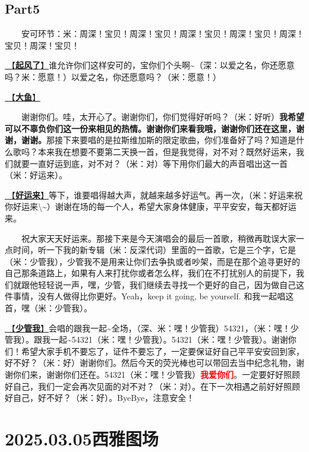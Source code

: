 \documentclass[]{ctexbook}
\begin{document}
\section{Part5}\label{LasVegas-20250301-part5}

  安可环节：米：周深！宝贝！周深！宝贝！周深！宝贝！周深！宝贝！周深！宝贝！周深！宝贝！

\hyperref[the-wind-rises]{🎵【\textbf{起风了}】}谁允许你们这样安可的，宝你们个头啊\textasciitilde（深：以爱之名，你还愿意吗？米：愿意！）以爱之名，你还愿意吗？（米：愿意！）

\hyperref[big-fish]{🎵【\textbf{大鱼}】}

  谢谢你们。哇，太开心了。谢谢你们，你们觉得好听吗？（米：好听）\textbf{我希望可以不辜负你们这一份来相见的热情。谢谢你们来看我哦，谢谢你们还在这里，谢谢，谢谢。}那接下来要唱的是拉斯维加斯的限定歌曲，你们准备好了吗？知道是什么歌吗？本来我在想要不要第二天换一首，但是我觉得，对不对？既然好运来，我们就要一直好运到底，对不对？（米：对）等下用你们最大的声音唱出这一首（米：好运来）。

\hyperref[good-luck-comes]{🎵【\textbf{好运来}】}等下，谁要唱得越大声，就越来越多好运气。再一次，（米：好运来祝你好运来\textbackslash\textasciitilde）谢谢在场的每一个人，希望大家身体健康，平平安安，每天都好运来。

  祝大家天天好运来。那接下来是今天演唱会的最后一首歌，稍微再耽误大家一点时间，听一下我的新专辑（米：反深代词）里面的一首歌，它是三个字，它是（米：少管我），少管我不是用来让你们去争执或者吵架，而是在那个追寻更好的自己那条道路上，如果有人来打扰你或者怎么样，我们在不打扰别人的前提下，我们就跟他轻轻说一声，嘿，少管，我们继续去寻找一个更好的自己，因为做自己这件事情，没有人做得比你更好。Yeah，keep it going, be yourself. 和我一起唱这首，嘿（米：少管我）。

\hyperref[watch-ur-manners]{🎵【\textbf{少管我}】}会唱的跟我一起\textasciitilde 全场，（深、米：嘿！少管我）54321，（米：嘿！少管我）。跟我一起\textasciitilde54321（米：嘿！少管我）。54321（米：嘿！少管我）。谢谢你们！希望大家手机不要忘了，证件不要忘了，一定要保证好自己平平安安回到家，好不好？（米：好）谢谢你们。然后今天的荧光棒也可以带回去当中纪念礼物，谢谢你们来，谢谢你们还在。54321（米：嘿！少管我）\textbf{\textcolor{red}{我爱你们}}。一定要好好照顾好自己，我们一定会再次见面的对不对？（米：对）。在下一次相遇之前好好照顾好自己，好不好？（米：好）。ByeBye，注意安全！

\chapter{2025.03.05西雅图场}\label{Seattle-20250305}
\end{document}

